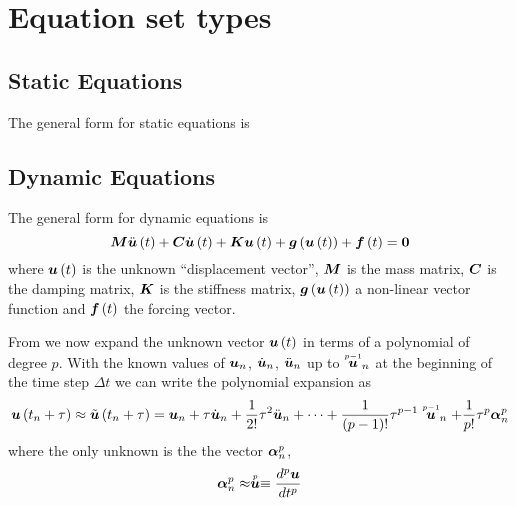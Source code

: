 \section{Equation set types}

\subsection{Static Equations}

The general form for static equations is

\subsection{Dynamic Equations}
\label{sec:dynamicequations}

The general form for dynamic equations is
\begin{equation}
  \matr{M}\fnof{\ddot{\vectr{u}}}{t}+\matr{C}\fnof{\dot{\vectr{u}}}{t}+\matr{K}\fnof{\vectr{u}}{t}+
  \fnof{\vectr{g}}{\fnof{\vectr{u}}{t}}+\fnof{\vectr{f}}{t}=\vectr{0}
  \label{eqn:generaldynamicnonlinear}
\end{equation}
where $ \boldsymbol{u}\left( t \right) $ is the unknown ``displacement vector'', $\matr{M}$
is the mass matrix, $\matr{C}$ is the damping matrix, $\matr{K}$ is the
stiffness matrix, $ \boldsymbol{g}\left(  \boldsymbol{u}\left( t \right)  \right) $ a non-linear vector
function and $ \boldsymbol{f}\left( t \right) $ the forcing vector.

From \cite{zienkiewicz:2006_1} we now expand the unknown vector $ \boldsymbol{u}\left( t \right) $ in terms of a polynomial of degree
$p$. With the known values of $\boldsymbol{u}_{n}$, $\dot{\boldsymbol{u}}_{n}$,
$\ddot{\boldsymbol{u}}_{n}$ up to $ \stackrel{\scriptscriptstyle p-1}{\boldsymbol{u}} _{n}$ at the beginning of
the time step $\Delta t$ we can write the polynomial expansion as
\begin{equation}
  \fnof{\vectr{u}}{t_{n}+\tau}\approx\fnof{\tilde{\vectr{u}}}{t_{n}+\tau}=\vectr{u}_{n}+\tau\dot{\vectr{u}}_{n}+
  \frac{1}{2!}\tau^{2}\ddot{\vectr{u}}_{n}+\cdots+\dfrac{1}{\factorial{p-1}}\tau^{p-1}\symover{p-1}{\vectr{u}}_{n}+
  \dfrac{1}{p!}\tau^{p}\vectr{\alpha}^{p}_{n}
  \label{eqn:timepolyexpansion}
\end{equation}
where the only unknown is the the vector $\boldsymbol{\alpha}^{p}_{n}$,
\begin{equation}
  \boldsymbol{\alpha}^{p}_{n}\approx \stackrel{\scriptscriptstyle p}{\boldsymbol{u}} \equiv \dfrac{ d^{p} \boldsymbol{u}}{d {t}^{p}} 
\end{equation}

